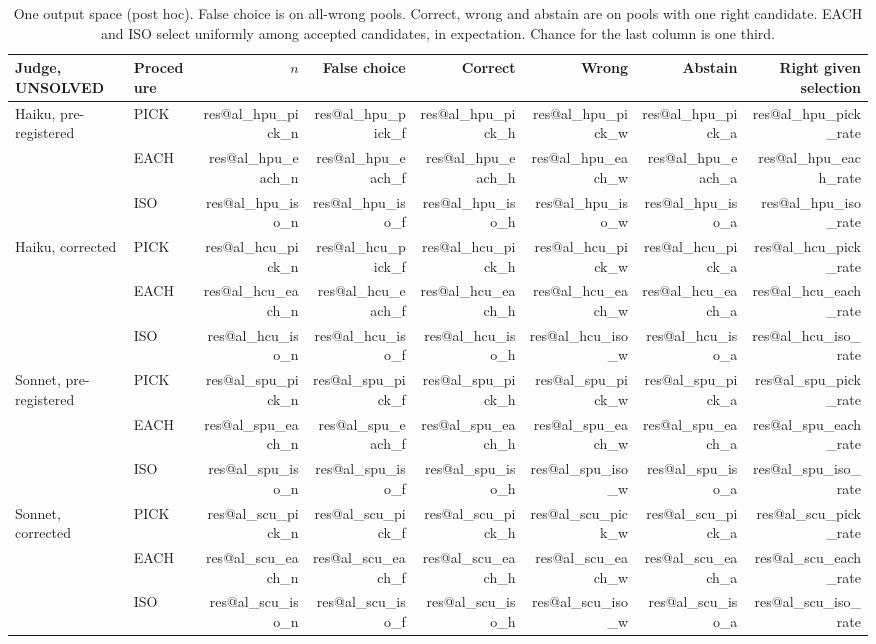 \documentclass[10pt,twocolumn]{article}
\makeatletter
\newcommand{\res}[1]{\csname res@#1\endcsname}
\makeatother
\begin{document}
\begin{table}[t]
\centering\small
\begin{tabular}{llrrrrrr}
\toprule
Judge, UNSOLVED & Procedure & $n$ & False choice & Correct & Wrong & Abstain & Right given selection \\
\midrule
Haiku, pre-registered & PICK & \res{al_hpu_pick_n} & \res{al_hpu_pick_f} & \res{al_hpu_pick_h} & \res{al_hpu_pick_w} & \res{al_hpu_pick_a} & \res{al_hpu_pick_rate} \\
 & EACH & \res{al_hpu_each_n} & \res{al_hpu_each_f} & \res{al_hpu_each_h} & \res{al_hpu_each_w} & \res{al_hpu_each_a} & \res{al_hpu_each_rate} \\
 & ISO & \res{al_hpu_iso_n} & \res{al_hpu_iso_f} & \res{al_hpu_iso_h} & \res{al_hpu_iso_w} & \res{al_hpu_iso_a} & \res{al_hpu_iso_rate} \\
Haiku, corrected & PICK & \res{al_hcu_pick_n} & \res{al_hcu_pick_f} & \res{al_hcu_pick_h} & \res{al_hcu_pick_w} & \res{al_hcu_pick_a} & \res{al_hcu_pick_rate} \\
 & EACH & \res{al_hcu_each_n} & \res{al_hcu_each_f} & \res{al_hcu_each_h} & \res{al_hcu_each_w} & \res{al_hcu_each_a} & \res{al_hcu_each_rate} \\
 & ISO & \res{al_hcu_iso_n} & \res{al_hcu_iso_f} & \res{al_hcu_iso_h} & \res{al_hcu_iso_w} & \res{al_hcu_iso_a} & \res{al_hcu_iso_rate} \\
Sonnet, pre-registered & PICK & \res{al_spu_pick_n} & \res{al_spu_pick_f} & \res{al_spu_pick_h} & \res{al_spu_pick_w} & \res{al_spu_pick_a} & \res{al_spu_pick_rate} \\
 & EACH & \res{al_spu_each_n} & \res{al_spu_each_f} & \res{al_spu_each_h} & \res{al_spu_each_w} & \res{al_spu_each_a} & \res{al_spu_each_rate} \\
 & ISO & \res{al_spu_iso_n} & \res{al_spu_iso_f} & \res{al_spu_iso_h} & \res{al_spu_iso_w} & \res{al_spu_iso_a} & \res{al_spu_iso_rate} \\
Sonnet, corrected & PICK & \res{al_scu_pick_n} & \res{al_scu_pick_f} & \res{al_scu_pick_h} & \res{al_scu_pick_w} & \res{al_scu_pick_a} & \res{al_scu_pick_rate} \\
 & EACH & \res{al_scu_each_n} & \res{al_scu_each_f} & \res{al_scu_each_h} & \res{al_scu_each_w} & \res{al_scu_each_a} & \res{al_scu_each_rate} \\
 & ISO & \res{al_scu_iso_n} & \res{al_scu_iso_f} & \res{al_scu_iso_h} & \res{al_scu_iso_w} & \res{al_scu_iso_a} & \res{al_scu_iso_rate} \\
\bottomrule
\end{tabular}
\caption{One output space (post hoc). False choice is on all-wrong pools. Correct, wrong and abstain are on pools with one right candidate. EACH and ISO select uniformly among accepted candidates, in expectation. Chance for the last column is one third.}
\label{tab:aligned}
\end{table}
\end{document}
